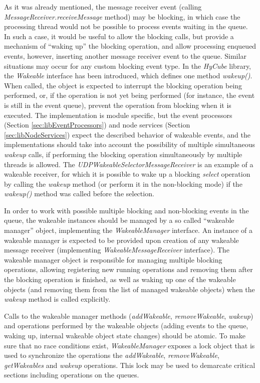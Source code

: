 As it was already mentioned, the message receiver event (calling \emph{MessageReceiver.receiveMessage} method) may be blocking, in which case the processing thread would not be possible to process events waiting in the queue. In such a case, it would be useful to allow the blocking calls, but provide a mechanism of ``waking up'' the blocking operation, and allow processing enqueued events, however, inserting another message receiver event to the queue. Similar situations may occur for any custom blocking event type. In the \emph{HyCube} library, the \emph{Wakeable} interface has been introduced, which defines one method \emph{wakeup()}. When called, the object is expected to interrupt the blocking operation being performed, or, if the operation is not yet being performed (for instance, the event is still in the event queue), prevent the operation from blocking when it is executed. The implementation is module specific, but the event processors (Section \ref{sec:libEventProcessors}) and node services (Section \ref{sec:libNodeServices}) expect the described behavior of wakeable events, and the implementations should take into account the possibility of multiple simultaneous \emph{wakeup} calls, if performing the blocking operation simultaneously by multiple threads is allowed. The \emph{UDPWakeableSelectorMessageReceiver} is an example of a wakeable receiver, for which it is possible to wake up a blocking \emph{select} operation by calling the \emph{wakeup} method (or perform it in the non-blocking mode) if the \emph{wakeup()} method was called before the selection.

In order to work with possible multiple blocking and non-blocking events in the queue, the wakeable instances should be managed by a so called ``wakeable manager'' object, implementing the \emph{WakeableManager} interface. An instance of a wakeable manager is expected to be provided upon creation of any wakeable message receiver (implementing \emph{WakeableMessageReceiver} interface). The wakeable manager object is responsible for managing multiple blocking operations, allowing registering new running operations and removing them after the blocking operation is finished, as well as waking up one of the wakeable objects (and removing them from the list of managed wakeable objects) when the \emph{wakeup} method is called explicitly.

Calls to the wakeable manager methods (\emph{addWakeable}, \emph{removeWakeable}, \emph{wakeup}) and operations performed by the wakeable objects (adding events to the queue, waking up, internal wakeable object state changes) should be atomic. To make sure that no race conditions exist, \emph{WakeableManager} exposes a lock object that is used to synchronize the operations the \emph{addWakeable}, \emph{removeWakeable}, \emph{getWakeables} and \emph{wakeup} operations. This lock may be used to demarcate critical sections including operations on the queues.

